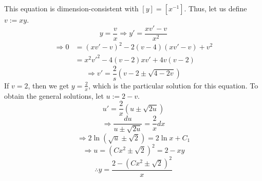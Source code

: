 \item

This equation is dimension-consistent with $[y] = [x^{-1}]$.
Thus, let us define $v := xy$.
\[
	y = \frac{v}{x}
	\Rightarrow y' = \frac{xv' - v}{x^2}
\]
\begin{align*}
	\Rightarrow 0
	&= {\left( xv' - v \right)}^2 - 2(v - 4)\left( xv' - v\right) + v^2 \\
	&= x^2 v'^2 - 4(v - 2) x v' + 4v(v - 2)
\end{align*}
\[
	\Rightarrow v' = \frac{2}{s}\left( v - 2 \pm \sqrt{4 - 2v} \right)
\]
If $v = 2$, then we get $y = \frac{2}{x}$, which is the particular solution for this equation.
To obtain the general solutions, let $u := 2 - v$.
\[
	u' = \frac{2}{x} \left( u \pm \sqrt{2u} \right)
\]
\[
	\Rightarrow \frac{du}{u \pm \sqrt{2u}} = \frac{2}{x} dx
\]
\[
	\Rightarrow 2 \ln \left( \sqrt{u} \pm \sqrt{2} \right) = 2 \ln x + C_1
\]
\[
	\Rightarrow u = {\left( Cx^2 \pm \sqrt{2} \right)}^2 = 2 - xy
\]
\[
	\therefore y = \frac{2 - {\left( Cx^2 \pm \sqrt{2} \right)}^2}{x}
\]